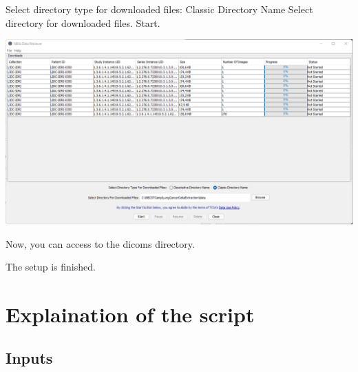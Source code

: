 \documentclass[12pt]{article}
\begin{document}
Select directory type for downloaded files: Classic Directory Name
Select directory for downloaded files.
Start.

\includegraphics{NBIA}


Now, you can access to the dicoms directory.

The setup is finished.
	\pagebreak
	
	\section{Explaination of the script}\label{sec:explain}
	\subsection{Inputs}
	
\end{document}
